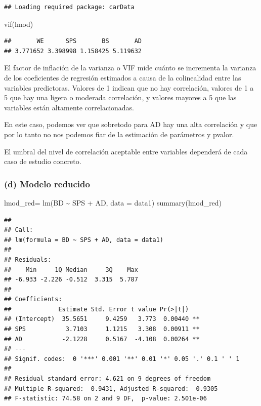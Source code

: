 \documentclass[
]{article}
\newenvironment{Shaded}{\begin{snugshade}}{\end{snugshade}}
\newcommand{\AttributeTok}[1]{\textcolor[rgb]{0.77,0.63,0.00}{#1}}
\newcommand{\FunctionTok}[1]{\textcolor[rgb]{0.00,0.00,0.00}{#1}}
\newcommand{\NormalTok}[1]{#1}
\newcommand{\OtherTok}[1]{\textcolor[rgb]{0.56,0.35,0.01}{#1}}
\newcommand{\SpecialCharTok}[1]{\textcolor[rgb]{0.00,0.00,0.00}{#1}}
\begin{document}
\begin{verbatim}
## Loading required package: carData
\end{verbatim}

\begin{Shaded}
\begin{Highlighting}[]
\FunctionTok{vif}\NormalTok{(lmod)}
\end{Highlighting}
\end{Shaded}

\begin{verbatim}
##       WE      SPS       BS       AD 
## 3.771652 3.398998 1.158425 5.119632
\end{verbatim}

El factor de inflación de la varianza o VIF mide cuánto se incrementa la
varianza de los coeficientes de regresión estimados a causa de la
colinealidad entre las variables predictoras. Valores de 1 indican que
no hay correlación, valores de 1 a 5 que hay una ligera o moderada
correlación, y valores mayores a 5 que las variables están altamente
correlacionadas.

En este caso, podemos ver que sobretodo para AD hay una alta correlación
y que por lo tanto no nos podemos fiar de la estimación de parámetros y
pvalor.

El umbral del nivel de correlación aceptable entre variables dependerá
de cada caso de estudio concreto.

\hypertarget{d-modelo-reducido}{%
\subsubsection{(d) Modelo reducido}\label{d-modelo-reducido}}

\begin{Shaded}
\begin{Highlighting}[]
\NormalTok{lmod\_red}\OtherTok{=} \FunctionTok{lm}\NormalTok{(BD }\SpecialCharTok{\textasciitilde{}}\NormalTok{ SPS }\SpecialCharTok{+}\NormalTok{ AD, }\AttributeTok{data =}\NormalTok{ data1)}
\FunctionTok{summary}\NormalTok{(lmod\_red)}
\end{Highlighting}
\end{Shaded}

\begin{verbatim}
## 
## Call:
## lm(formula = BD ~ SPS + AD, data = data1)
## 
## Residuals:
##    Min     1Q Median     3Q    Max 
## -6.933 -2.226 -0.512  3.315  5.787 
## 
## Coefficients:
##             Estimate Std. Error t value Pr(>|t|)   
## (Intercept)  35.5651     9.4259   3.773  0.00440 **
## SPS           3.7103     1.1215   3.308  0.00911 **
## AD           -2.1228     0.5167  -4.108  0.00264 **
## ---
## Signif. codes:  0 '***' 0.001 '**' 0.01 '*' 0.05 '.' 0.1 ' ' 1
## 
## Residual standard error: 4.621 on 9 degrees of freedom
## Multiple R-squared:  0.9431, Adjusted R-squared:  0.9305 
## F-statistic: 74.58 on 2 and 9 DF,  p-value: 2.501e-06
\end{verbatim}
\end{document}
